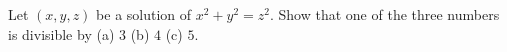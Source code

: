 Let $(x, y, z)$ be a solution of $x^2 + y^2 = z^2$. Show that one of the three numbers is divisible by (a) $3$ (b) $4$ (c) $5$.
